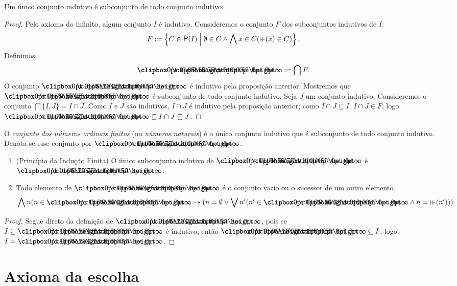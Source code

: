 \begin{proposition}
Um único conjunto indutivo é subconjunto de todo conjunto indutivo.
\end{proposition}
\begin{proof}
Pelo axioma do infinito, algum conjunto $I$ é indutivo. Consideremos o conjunto $F$ dos subconjuntos indutivos de $I$:
	\begin{equation*}
	F := \set{C \in \p(I)}{\emptyset \in C \lee \forall x \in C(\suce(x) \in C)}.
	\end{equation*}
Definimos
	\begin{equation*}
	\inftyord := \bigcap F.
	\end{equation*}
O conjunto $\inftyord$ é indutivo pela proposição anterior. Mostremos que $\inftyord$ é subconjunto de todo conjunto indutivo. Seja $J$ um conjunto indutivo. Consideremos o conjunto $\bigcap\{I,J\} = I \cap J$. Como $I$ e $J$ são indutivos, $I \cap J$ é indutivo pela proposição anterior; como $I \cap J \subseteq I$, $I \cap J \in F$, logo $\inftyord \subseteq I \cap J \subseteq J$.
\end{proof}

\begin{definition}
O \emph{conjunto dos números ordinais finitos} (ou \emph{números naturais}) é o único conjunto indutivo que é subconjunto de todo conjunto indutivo. Denota-se esse conjunto por $\inftyord$.
\end{definition}

\begin{proposition}
	\begin{enumerate}
	\item (Princípio da Indução Finita) O único subconjunto indutivo de $\inftyord$ é $\inftyord$;
	\item Todo elemento de $\inftyord$ é o conjunto vazio ou o sucessor de um outro elemento.
		\begin{equation*}
		\forall n (n \in \inftyord \limplica (n=\emptyset \lou \exists n' (n' \in \inftyord \lee n=\suce(n')))
		\end{equation*}
	\end{enumerate}
\end{proposition}
\begin{proof}
Segue direto da definição de $\inftyord$, pois se $I \subseteq \inftyord$ é indutivo, então $\inftyord \subseteq I$, logo $I = \inftyord$.
\end{proof}



\section{Axioma da escolha}

